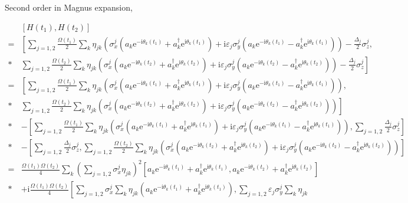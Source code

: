 \documentclass[10pt,fleqn]{article}
\newcommand{\ue}{\mathrm{e}}
\newcommand{\ui}{\mathrm{i}}
\newcommand{\eqar}[1]
{
  \begin{align*}
    #1
  \end{align*}
}
\newcommand{\paren}[1]{{\left({#1}\right)}}
\newcommand{\sqr}[1]{{\left[{#1}\right]}}
\begin{document}
Second order in Magnus expansion,
\eqar{
  &\sqr{H(t_1), H(t_2)}\\
  =&\left[\sum_{j=1,2}\frac{\Omega(t_1)}{2}\sum_{k}\eta_{jk}\paren{
      \sigma^j_x\paren{a_k\ue^{-\ui\theta_k(t_1)}+a_k^\dagger\ue^{\ui\theta_k(t_1)}}
      +\ui\varepsilon_j\sigma^j_y\paren{a_k\ue^{-\ui\theta_k(t_1)}-a_k^\dagger\ue^{\ui\theta_k(t_1)}}
    } - \frac{\Delta_j}{2}\sigma_z^j,\right.\\*
  &\left.\sum_{j=1,2}\frac{\Omega(t_2)}{2}\sum_{k}\eta_{jk}\paren{
      \sigma^j_x\paren{a_k\ue^{-\ui\theta_k(t_2)}+a_k^\dagger\ue^{\ui\theta_k(t_2)}}
      +\ui\varepsilon_j\sigma^j_y\paren{a_k\ue^{-\ui\theta_k(t_2)}-a_k^\dagger\ue^{\ui\theta_k(t_2)}}
    } - \frac{\Delta_j}{2}\sigma_z^j\right]\\
  =&\left[\sum_{j=1,2}\frac{\Omega(t_1)}{2}\sum_{k}\eta_{jk}\paren{
      \sigma^j_x\paren{a_k\ue^{-\ui\theta_k(t_1)}+a_k^\dagger\ue^{\ui\theta_k(t_1)}}
      +\ui\varepsilon_j\sigma^j_y\paren{a_k\ue^{-\ui\theta_k(t_1)}-a_k^\dagger\ue^{\ui\theta_k(t_1)}}
    },\right.\\*
  &\left.\sum_{j=1,2}\frac{\Omega(t_2)}{2}\sum_{k}\eta_{jk}\paren{
      \sigma^j_x\paren{a_k\ue^{-\ui\theta_k(t_2)}+a_k^\dagger\ue^{\ui\theta_k(t_2)}}
      +\ui\varepsilon_j\sigma^j_y\paren{a_k\ue^{-\ui\theta_k(t_2)}-a_k^\dagger\ue^{\ui\theta_k(t_2)}}
    }\right]\\*
  &-\left[\sum_{j=1,2}\frac{\Omega(t_1)}{2}\sum_{k}\eta_{jk}\paren{
      \sigma^j_x\paren{a_k\ue^{-\ui\theta_k(t_1)}+a_k^\dagger\ue^{\ui\theta_k(t_1)}}
      +\ui\varepsilon_j\sigma^j_y\paren{a_k\ue^{-\ui\theta_k(t_1)}-a_k^\dagger\ue^{\ui\theta_k(t_1)}}
    },\sum_{j=1,2}\frac{\Delta_j}{2}\sigma_z^j\right]\\*
  &-\left[\sum_{j=1,2}\frac{\Delta_j}{2}\sigma_z^j,
    \sum_{j=1,2}\frac{\Omega(t_2)}{2}\sum_{k}\eta_{jk}\paren{
      \sigma^j_x\paren{a_k\ue^{-\ui\theta_k(t_2)}+a_k^\dagger\ue^{\ui\theta_k(t_2)}}
      +\ui\varepsilon_j\sigma^j_y\paren{a_k\ue^{-\ui\theta_k(t_2)}-a_k^\dagger\ue^{\ui\theta_k(t_2)}}
    }\right]\\
  =&\frac{\Omega(t_1)\Omega(t_2)}{4}\sum_{k}\paren{\sum_{j=1,2}\sigma^j_x\eta_{jk}}^2
  \left[
    a_k\ue^{-\ui\theta_k(t_1)}+a_k^\dagger\ue^{\ui\theta_k(t_1)}
    ,a_k\ue^{-\ui\theta_k(t_2)}+a_k^\dagger\ue^{\ui\theta_k(t_2)}
  \right]\\*
  &+\ui\frac{\Omega(t_1)\Omega(t_2)}{4}\left[\sum_{j=1,2}\sigma^j_x\sum_{k}\eta_{jk}
    \paren{a_k\ue^{-\ui\theta_k(t_1)}+a_k^\dagger\ue^{\ui\theta_k(t_1)}}
    ,\sum_{j=1,2}\varepsilon_j\sigma^j_y\sum_{k}\eta_{jk}
}
\end{document}
